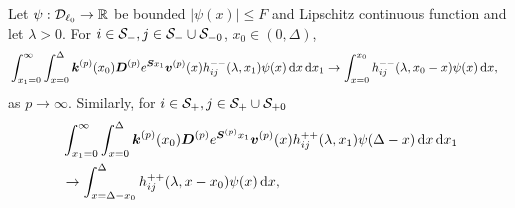 
\begin{lem}\label{lem: ppp}
	Let \(\psi:\mathcal{D}_{\ell_0}\to \mathbb R\) be bounded \(|\psi(x)|\leq F\) and Lipschitz continuous function and let \(\lambda >0\). For \(i\in\mathcal S_-,j\in\mathcal S_-\cup\mathcal{S}_{-0}\), \(x_0\in(0,\Delta)\), 
	\begin{align}
		&\int_{x_1=0}^\infty \int_{x=0}^{\Delta}\boldsymbol k^{(p)}(x_0) \boldsymbol D^{(p)} e^{\boldsymbol S x_1} {\boldsymbol v}^{(p)}(x) h_{ij}^{--}(\lambda, x_1) \psi(x) \, \mathrm{d} x \, \mathrm{d} x_1  
		\to \int_{x=0}^{x_0} h_{ij}^{--}(\lambda,x_0-x)\psi(x)\, \mathrm{d} x, \label{eqn: LLLlllL}
	\end{align}
	as \(p\to\infty\). Similarly, for \(i\in\mathcal S_+,j\in\mathcal S_+\cup\mathcal{S}_{+0}\)
	\begin{align}
		&\int_{x_1=0}^\infty \int_{x=0}^{\Delta}\boldsymbol k^{(p)}(x_0) \boldsymbol D^{(p)} e^{\boldsymbol S^{(p)} x_1} {\boldsymbol v}^{(p)}(x) h_{ij}^{++}(\lambda, x_1) \psi(\Delta-x) \, \mathrm{d} x \, \mathrm{d} x_1  \nonumber 
		\\&\to\int_{x=\Delta-x_0}^{\Delta} h_{ij}^{++}(\lambda,x-x_0)\psi(x)\, \mathrm{d} x, \label{eqn: LLLlllL2222}
	\end{align}
\end{lem}
